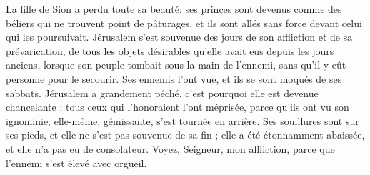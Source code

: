 La fille de Sion a perdu toute sa beauté: ses princes sont devenus comme des béliers qui ne trouvent point de pâturages, et ils sont allés sans force devant celui qui les poursuivait.
Jérusalem s'est souvenue des jours de son affliction et de sa prévarication, de tous les objets désirables qu'elle avait eus depuis les jours anciens, lorsque son peuple tombait sous la main de l'ennemi, sans qu'il y eût personne pour le secourir. Ses ennemis l'ont vue, et ils se sont moqués de ses sabbats.
Jérusalem a grandement péché, c'est pourquoi elle est devenue chancelante ; tous ceux qui l'honoraient l'ont méprisée, parce qu'ils ont vu son ignominie; elle-même, gémissante, s'est tournée en arrière.
Ses souillures sont sur ses pieds, et elle ne s'est pas souvenue de sa fin ; elle a été étonnamment abaissée, et elle n'a pas eu de consolateur. Voyez, Seigneur, mon affliction, parce que l'ennemi s'est élevé avec orgueil.